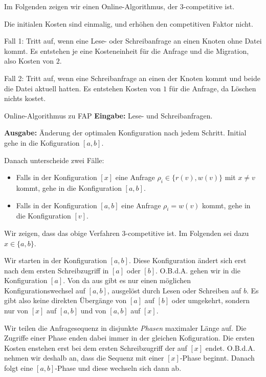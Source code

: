 \documentclass{panikzettel}
\begin{document}
\begin{halfboxl}
Im Folgenden zeigen wir einen Online-Algorithmus, der $3$-competitive ist.

Die initialen Kosten sind einmalig, und erhöhen den competitiven Faktor nicht.

Fall 1: Tritt auf, wenn eine Lese- oder Schreibanfrage an einen Knoten ohne Datei kommt. Es entstehen je eine Kosteneinheit für die Anfrage und die Migration, also Kosten von $2$.

Fall 2: Tritt auf, wenn eine Schreibanfrage an einen der Knoten kommt und beide die Datei aktuell hatten. Es entstehen Kosten von $1$ für die Anfrage, da Löschen nichts kostet.
\end{halfboxl}%
\begin{halfboxr}
\vspace{-\baselineskip}
\begin{algo}{Online-Algorithmus zu FAP}
    \textbf{Eingabe:} Lese- und Schreibanfragen.

    \textbf{Ausgabe:} Änderung der optimalen Konfiguration nach jedem Schritt.
    \tcblower
    Initial gehe in die Kofiguration $[a,b]$.

    Danach unterscheide zwei Fälle:
    \begin{itemize}
        \item Falls in der Konfiguration $[x]$ eine Anfrage $\rho_i \in \{r(v),w(v)\}$ mit $x \neq v$ kommt, gehe in die Konfiguration $[a,b]$.
        \item Falls in der Konfiguration $[a,b]$ eine Anfrage $\rho_i=w(v)$ kommt, gehe in die Konfiguration $[v]$.
    \end{itemize}
\end{algo}
\end{halfboxr}

Wir zeigen, dass das obige Verfahren $3$-competitive ist.
Im Folgenden sei dazu $x \in \{a,b\}$.

Wir starten in der Konfiguration $[a,b]$. Diese Konfiguration ändert sich erst nach dem ersten Schreibzugriff in $[a]$ oder $[b]$. O.B.d.A. gehen wir in die Konfiguration $[a]$. Von da aus gibt es nur einen möglichen Konfigurationswechsel auf $[a,b]$, ausgelöst durch Lesen oder Schreiben auf $b$. Es gibt also keine direkten Übergänge von $[a]$ auf $[b]$ oder umgekehrt, sondern nur von $[x]$ auf $[a,b]$ und von $[a,b]$ auf $[x]$.

Wir teilen die Anfragesequenz in disjunkte \emph{Phasen} maximaler Länge auf. Die Zugriffe einer Phase enden dabei immer in der gleichen Kofiguration. Die ersten Kosten enstehen erst bei dem ersten Schreibzugriff der auf $[x]$ endet. O.B.d.A. nehmen wir deshalb an, dass die Sequenz mit einer $[x]$-Phase beginnt. Danach folgt eine $[a,b]$-Phase und diese wechseln sich dann ab.
\end{document}
